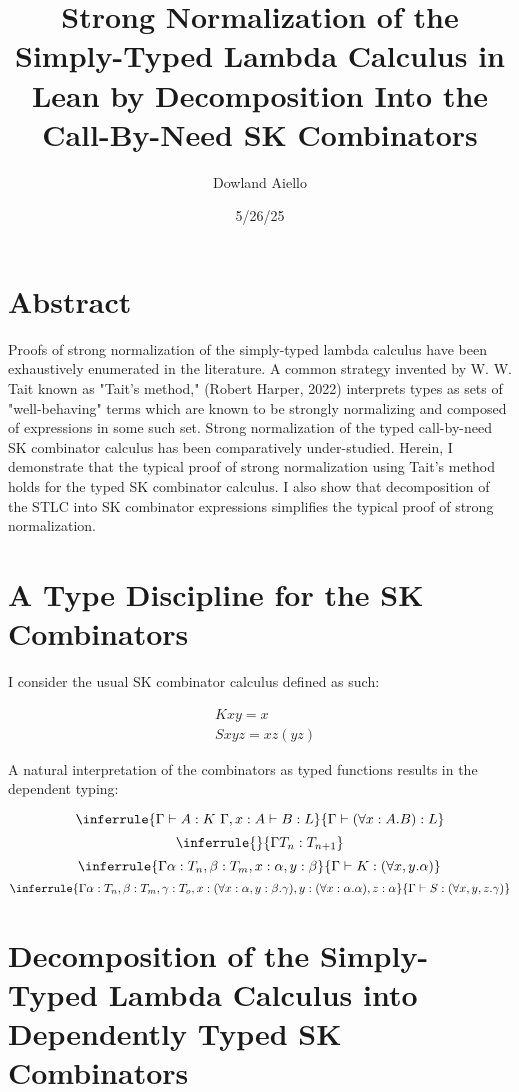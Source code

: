 \documentclass[11pt]{article}
\author{Dowland Aiello}
\date{5/26/25}
\title{Strong Normalization of the Simply-Typed Lambda Calculus in Lean by Decomposition Into the Call-By-Need SK Combinators}
\begin{document}
\maketitle
\tableofcontents

\section{Abstract}
\label{sec:orgc32f9a1}

Proofs of strong normalization of the simply-typed lambda calculus have been exhaustively enumerated in the literature. A common strategy invented by W. W. Tait known as "Tait's method," (Robert Harper, 2022) interprets types as sets of "well-behaving" terms which are known to be strongly normalizing and composed of expressions in some such set.
Strong normalization of the typed call-by-need SK combinator calculus has been comparatively under-studied. Herein, I demonstrate that the typical proof of strong normalization using Tait's method holds for the typed SK combinator calculus. I also show that decomposition of the STLC into SK combinator expressions simplifies the typical proof of strong normalization.
\section{A Type Discipline for the SK Combinators}
\label{sec:orgcde23bf}

I consider the usual SK combinator calculus defined as such:

\begin{align}
& K xy = x \\
& S xyz = xz (yz)
\end{align}

A natural interpretation of the combinators as typed functions results in the dependent typing:

\label{inference:1}

\[
\inferrule
  { \Gamma \vdash A : K \ \Gamma,x : A \vdash B : L }
  { \Gamma \vdash (\forall x : A.B) : L}
\]
\[
\inferrule
  { }
  { \Gamma T_{n} : T_{n + 1} }
\]
\[
\inferrule
  { \Gamma \alpha : T_{n}, \beta : T_{m}, x : \alpha, y : \beta }
  { \Gamma \vdash K : (\forall x, y.\alpha) }
\]
\[
\inferrule
  { \Gamma \alpha : T_{n}, \beta : T_{m}, \gamma : T_{o}, x : (\forall x : \alpha, y : \beta.\gamma), y : (\forall x : \alpha.\alpha), z : \alpha }
  { \Gamma \vdash S : (\forall x, y, z.\gamma) }
\]

\label{decomplemma:1}
\section{Decomposition of the Simply-Typed Lambda Calculus into Dependently Typed SK Combinators}
\label{sec:orge60c753}
\end{document}
